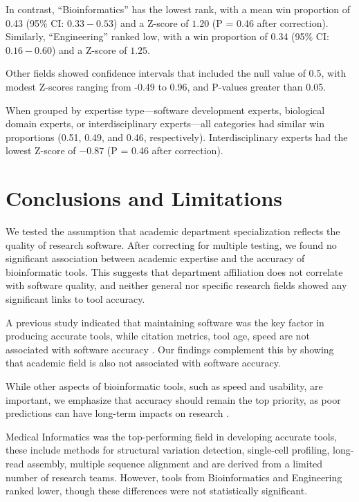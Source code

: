 \documentclass[fleqn,10pt,doc,onecolumn]{SelfArx}%
\begin{document}
In contrast, ``Bioinformatics'' has the lowest rank, with a mean win
proportion of 0.43 (95\% CI: $0.33-0.53$) and a Z-score of $1.20$ (P =
0.46 after correction). Similarly, ``Engineering'' ranked low, with a
win proportion of 0.34 (95\% CI: $0.16-0.60$) and a Z-score of $1.25$.

Other fields showed confidence intervals that included the null value
of 0.5, with modest Z-scores ranging from -0.49 to 0.96, and P-values
greater than 0.05.

When grouped by expertise type—software development experts,
biological domain experts, or interdisciplinary experts—all categories
had similar win proportions (0.51, 0.49, and 0.46,
respectively). Interdisciplinary experts had the lowest Z-score of
$-0.87$ (P = 0.46 after correction).



\section*{Conclusions and Limitations}

We tested the assumption that academic department specialization
reflects the quality of research software. After correcting for
multiple testing, we found no significant association between academic
expertise and the accuracy of bioinformatic tools. This suggests that
department affiliation does not correlate with software quality, and
neither general nor specific research fields showed any significant
links to tool accuracy.

A previous study indicated that maintaining software was the key
factor in producing accurate tools, while citation metrics, tool age,
speed are not associated with software accuracy \cite{Gardner:2022}.
Our findings complement this by showing that academic field is also not
associated with software accuracy.

While other aspects of bioinformatic tools, such as speed and
usability, are important, we emphasize that accuracy should remain the
top priority, as poor predictions can have long-term impacts on
research \cite{weber2019essential}.

Medical Informatics was the top-performing field in developing
accurate tools, these include methods for structural variation
detection, single-cell profiling, long-read assembly, multiple
sequence alignment and are derived from a limited number of research
teams. However, tools from Bioinformatics and Engineering
ranked lower, though these differences were not statistically
significant.
\end{document}
